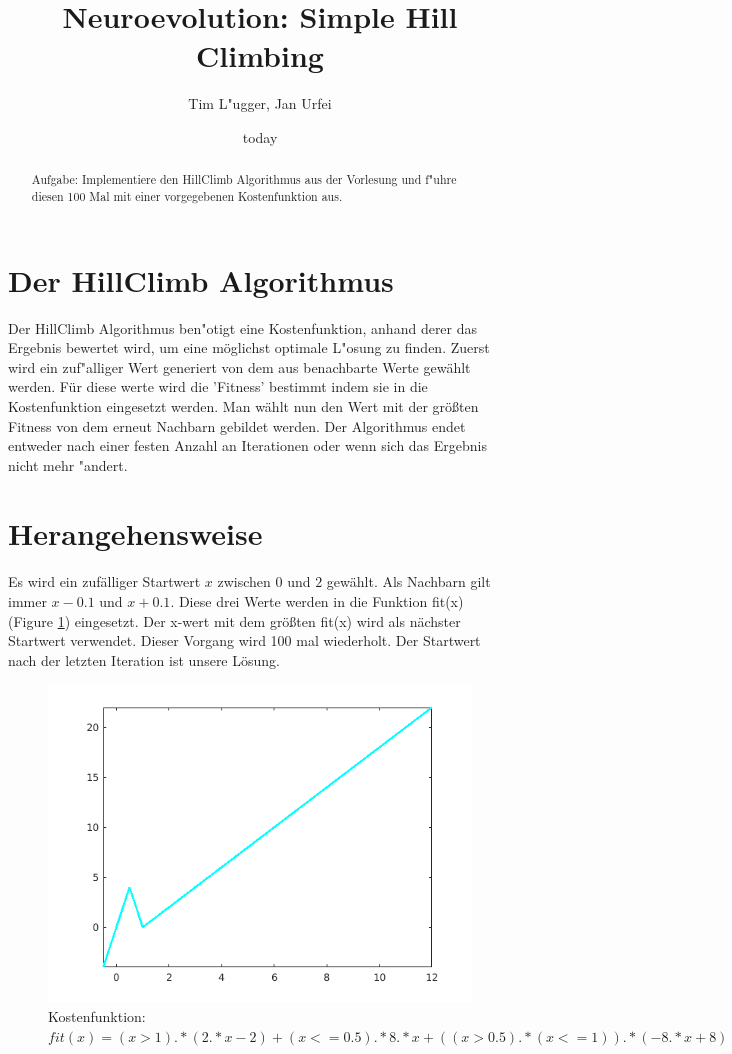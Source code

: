 \documentclass{hbrs-ecta-report}
\begin{document}

\title{Neuroevolution: Simple Hill Climbing}
\subtitle{}

\author{
\alignauthor
Tim L"ugger, Jan Urfei
}

\date{today}
\maketitle
\begin{abstract}
Aufgabe: Implementiere den HillClimb Algorithmus aus der Vorlesung und f"uhre diesen 100 Mal mit einer vorgegebenen Kostenfunktion aus.
\end{abstract}

\section{Der HillClimb Algorithmus}
Der HillClimb Algorithmus ben"otigt eine Kostenfunktion, anhand derer das Ergebnis bewertet wird, um eine möglichst optimale L"osung zu finden. Zuerst wird ein zuf"alliger Wert generiert von dem aus benachbarte Werte gewählt werden. Für diese werte wird die 'Fitness' bestimmt indem sie in die Kostenfunktion eingesetzt werden. Man wählt nun den Wert mit der größten Fitness von dem erneut Nachbarn gebildet werden. Der Algorithmus endet entweder nach einer festen Anzahl an Iterationen oder wenn sich das Ergebnis nicht mehr "andert.

\section{Herangehensweise}

Es wird ein zufälliger Startwert $x$ zwischen $0$ und $2$ gewählt. Als Nachbarn gilt immer $x - 0.1$ und $x + 0.1$. Diese drei Werte werden in die Funktion fit(x) (Figure \ref{fig:fit}) eingesetzt. Der x-wert mit dem größten fit(x) wird als nächster Startwert verwendet. Dieser Vorgang wird 100 mal wiederholt. Der Startwert nach der letzten Iteration ist unsere Lösung. 

\begin{figure}[h!]
	\includegraphics[width=0.55\linewidth]{img/fit}
	\caption{Kostenfunktion: $fit(x) = (x>1).*(2.*x-2) + (x<=0.5).*8.*x + ((x>0.5).*(x<=1)).*(-8.*x + 8) $}
	\label{fig:fit}
\end{figure}
\end{document}
